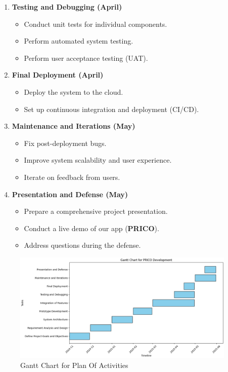 \documentclass[12pt]{report}
\begin{document}
\begin{enumerate}
\begin{itemize}
	      \end{itemize}
	\item \textbf{Testing and Debugging (April)}
	      \begin{itemize}
		      \item Conduct unit tests for individual components.
		      \item Perform automated system testing.
		      \item Perform user acceptance testing (UAT).
	      \end{itemize}
	\item \textbf{Final Deployment (April)}
	      \begin{itemize}
		      \item Deploy the system to the cloud.
		      \item Set up continuous integration and deployment (CI/CD).
	      \end{itemize}
	\item \textbf{Maintenance and Iterations (May)}
	      \begin{itemize}
		      \item Fix post-deployment bugs.
		      \item Improve system scalability and user experience.
		      \item Iterate on feedback from users.
	      \end{itemize}
	\item \textbf{Presentation and Defense (May)}
	      \begin{itemize}
		      \item Prepare a comprehensive project presentation.
		      \item Conduct a live demo of our app (\textbf{PRICO}).
		      \item Address questions during the defense.
	      \end{itemize}

\end{enumerate}

\begin{figure}[H]
	\begin{center}
		\includegraphics[width=0.95\textwidth]{images/gannt}
	\end{center}
	\caption{Gantt Chart for Plan Of Activities}
\end{figure}
\end{document}
